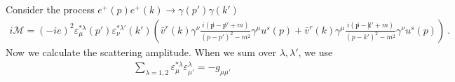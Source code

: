 
Consider the process $e^+(p)e^+(k)\rightarrow \gamma(p')\gamma(k')$
\begin{equation}
\begin{aligned}
i\mathcal{M} =(-ie)^2 \varepsilon^{*\lambda}_\mu(p') \varepsilon^{*\lambda'}_\nu(k') \left( \bar v^r(k)\gamma^\nu \frac{i({\not p}-{\not p}'+m)}{(p-p')^2-m^2} \gamma^\mu u^s(p) 
+
 \bar v^r(k)\gamma^\mu \frac{i({\not p}-{\not k}'+m)}{(p-k')^2-m^2} \gamma^\nu u^s(p) 
\right)~.
\end{aligned}
\end{equation}
Now we calculate the scattering amplitude. When we sum over $\lambda,\lambda'$, we use
\begin{equation}
\begin{aligned}
\sum_{\lambda=1,2}\varepsilon_\mu^{*\lambda} \varepsilon_{\mu'}^{\lambda}=-g_{\mu\mu'} 
\end{aligned}
\end{equation}

